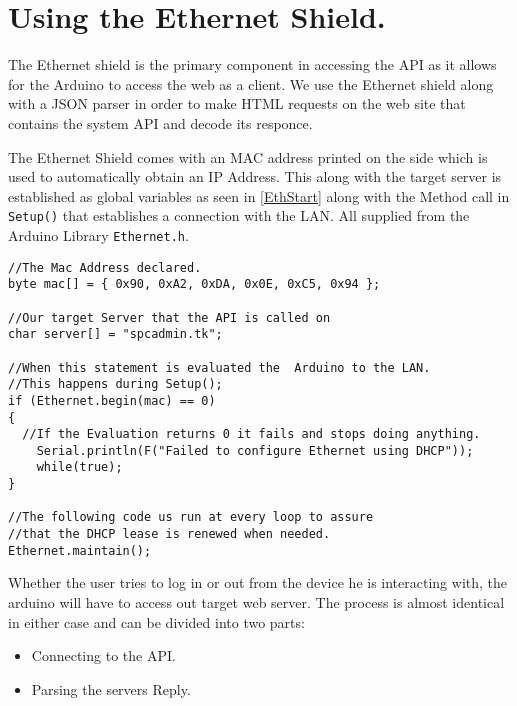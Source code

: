 \section{Using the Ethernet Shield.}
The Ethernet shield is the primary component in accessing the API as it allows for the Arduino to access the web as a client.
We use the Ethernet shield along with a JSON parser in order to make HTML requests on the web site that contains the system API and decode its responce.

The Ethernet Shield comes with an MAC address printed on the side which is used to automatically obtain an IP Address.
This along with the target server is established as global variables as seen in \autoref{EthStart} along with the Method call in \verb|Setup()| that establishes a connection with the LAN. All supplied from the Arduino Library \verb|Ethernet.h|.
\begin{lstlisting}[frame=single, label=EthStart, caption=The Method Calls used to establish and maintain a connection.]
//The Mac Address declared.
byte mac[] = { 0x90, 0xA2, 0xDA, 0x0E, 0xC5, 0x94 };

//Our target Server that the API is called on
char server[] = "spcadmin.tk";

//When this statement is evaluated the  Arduino to the LAN.
//This happens during Setup();
if (Ethernet.begin(mac) == 0) 
{
  //If the Evaluation returns 0 it fails and stops doing anything.
	Serial.println(F("Failed to configure Ethernet using DHCP"));
	while(true); 
}

//The following code us run at every loop to assure
//that the DHCP lease is renewed when needed.
Ethernet.maintain();
\end{lstlisting}

Whether the user tries to log in or out from the device he is interacting with, the arduino will have to access out target web server.
The process is almost identical in either case and can be divided into two parts:
\begin{itemize}
	\item Connecting to the API.
	\item Parsing the servers Reply.
\end{itemize}

